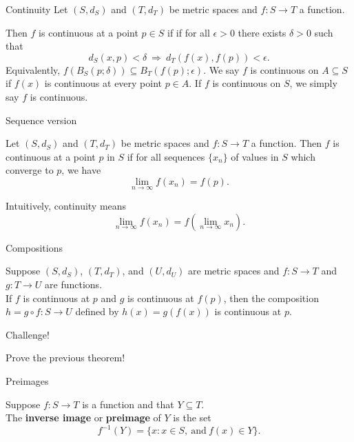 \documentclass{beamer}
\begin{document}
\begin{frame}{Continuity}
Let $(S,d_S)$ and $(T,d_T)$ be metric spaces and $f: S\rightarrow T$ a function.
\pause
\begin{defn}
\pause
Then $f$ is continuous at a point $p\in S$ if 
if for all $\epsilon > 0$ there exists $\delta > 0$ such that
$$d_S(x,p) < \delta\ \Rightarrow\ d_T(f(x),f(p)) < \epsilon.$$
\pause
Equivalently, $f(B_S(p;\delta))\subseteq B_T(f(p);\epsilon)$.
\pause
We say $f$ is continuous on $A\subseteq S$ if $f(x)$ is continuous at every point $p\in A$.
\pause
If $f$ is continuous on $S$, we simply say $f$ is continuous.
\end{defn}
\end{frame}

\begin{frame}{Sequence version}
\pause
\begin{thm}
Let $(S,d_S)$ and $(T,d_T)$ be metric spaces and $f: S\rightarrow T$ a function.
\pause
Then $f$ is continuous at a point $p$ in $S$ if for all sequences $\{x_n\}$ of values in $S$ which converge to $p$, we have
\pause
$$\lim_{n\rightarrow\infty} f(x_n) = f(p).$$
\end{thm}
\pause
Intuitively, continuity means
$$\lim_{n\rightarrow\infty} f(x_n) = f\left(\lim_{n\rightarrow\infty} x_n\right).$$
\end{frame}

\begin{frame}{Compositions}
\begin{thm}
Suppose $(S,d_S)$, $(T,d_T)$, and $(U,d_U)$ are metric spaces and $f: S\rightarrow T$ and $g: T\rightarrow U$ are functions.\\
\pause
If $f$ is continuous at $p$ and $g$ is continuous at $f(p)$, then the composition $h = g\circ f: S\rightarrow U$ defined by $h(x) = g(f(x))$ is continuous at $p$.
\end{thm}
\end{frame}

\begin{frame}{Challenge!}
\begin{prob}
Prove the previous theorem!
\end{prob}
\end{frame}

\begin{frame}{Preimages}
\begin{defn}
Suppose $f: S\rightarrow T$ is a function and that $Y\subseteq T$.\\
\pause
The \textbf{inverse image} or \textbf{preimage} of $Y$ is the set
$$f^{-1}(Y) = \{x: x\in S,\ \text{and}\ f(x)\in Y\}.$$
\end{defn}
\end{frame}
\end{document}
